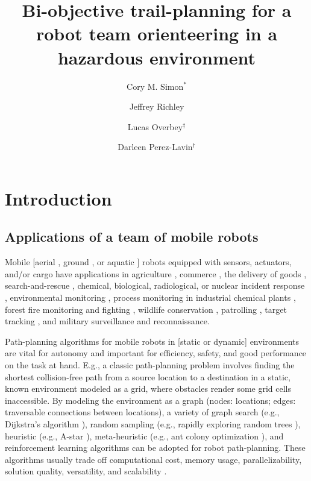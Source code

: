\documentclass[fleqn,10pt,lineno]{wlpeerj}
\title{Bi-objective trail-planning for a robot team orienteering in a hazardous environment}
\author[1]{Cory M. Simon$^*$}
\author[2]{Jeffrey Richley}
\author[2]{Lucas Overbey$^\ddagger$}
\author[2]{Darleen Perez-Lavin$^\dagger$}
\affil[1]{School of Chemical, Biological, and Environmental Engineering. Oregon State University. Corvallis, OR. USA.}
\affil[2]{Naval Information Warfare Center Atlantic. Charleston, SC. USA.}
\begin{document}
\flushbottom
\maketitle
\thispagestyle{empty}



\clearpage


\section{Introduction}
\subsection{Applications of a team of mobile robots}
Mobile [aerial \cite{leutenegger2016flying}, ground \cite{chung2016wheeled}, or aquatic \cite{choi2016underwater}] robots equipped with sensors, actuators, and/or cargo have applications in agriculture 
\cite{santos2020path,bawden2017robot,mcallister2018multi}, 
commerce %
 \cite{wurman2008coordinating}, 
the delivery of goods \cite{coelho2014thirty}, 
search-and-rescue \cite{queralta2020collaborative,rouvcek2020darpa}, 
chemical, biological, radiological, or nuclear incident response %
 \cite{murphy2012projected,hutchinson2019unmanned}, 
 environmental monitoring \cite{dunbabin2012robots,hernandez2012mobile,yuan2020maritime}, 
 process monitoring in industrial chemical plants \cite{soldan2014towards,francis2022gas}, 
 forest fire monitoring and fighting \cite{merino2012unmanned}, 
 wildlife conservation \cite{kamminga2018poaching},
 patrolling \cite{basilico2022recent},
 target tracking \cite{robin2016multi}, and 
 military surveillance and reconnaissance. 
 
Path-planning algorithms for mobile robots in [static or dynamic] environments \cite{lavalle2006planning,liu2023path,ugwoke2025simulation} are vital for autonomy and important for efficiency, safety, and good performance on the task at hand.
E.g., a classic path-planning problem involves \cite{lavalle2006planning} finding the shortest collision-free path from a source location to a destination in a static, known environment modeled as a grid, where obstacles render some grid cells inaccessible.
By modeling the environment as a graph (nodes: locations; edges: traversable connections between locations), a variety of graph search (e.g., Dijkstra's algorithm \cite{candra2020dijkstra}), random sampling (e.g., rapidly exploring random trees \cite{lavalle1998rapidly}), heuristic (e.g., A-star \cite{candra2020dijkstra}), meta-heuristic (e.g., ant colony optimization \cite{dorigo2006ant}), and reinforcement learning \cite{singh2023review} algorithms can be adopted for robot path-planning. 
These algorithms usually trade off computational cost, memory usage, parallelizability, solution quality, versatility, and scalability \cite{ugwoke2025simulation}.
\end{document}
